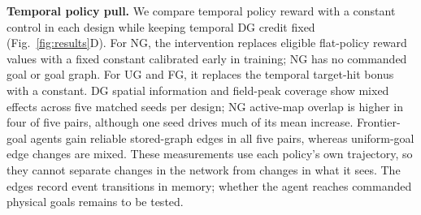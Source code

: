 \documentclass[letterpaper,12pt]{article}
\begin{document}
\textbf{Temporal policy pull.} We compare temporal policy reward with a constant control in each design while keeping temporal DG credit fixed (Fig.~\ref{fig:results}D). For NG, the intervention replaces eligible flat-policy reward values with a fixed constant calibrated early in training; NG has no commanded goal or goal graph. For UG and FG, it replaces the temporal target-hit bonus with a constant. DG spatial information and field-peak coverage show mixed effects across five matched seeds per design; NG active-map overlap is higher in four of five pairs, although one seed drives much of its mean increase. Frontier-goal agents gain reliable stored-graph edges in all five pairs, whereas uniform-goal edge changes are mixed. These measurements use each policy's own trajectory, so they cannot separate changes in the network from changes in what it sees. The edges record event transitions in memory; whether the agent reaches commanded physical goals remains to be tested.
\end{document}
